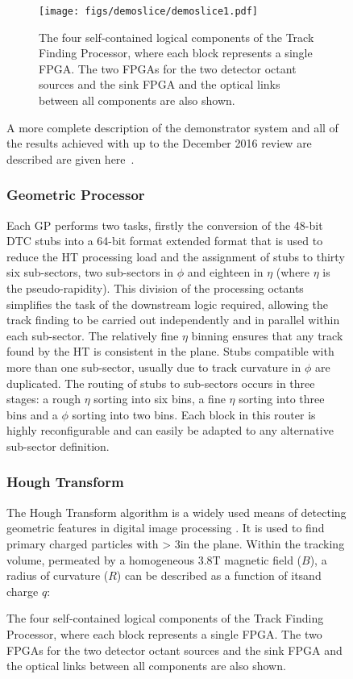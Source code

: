 \begin{figure}[tb]
\begin{figure}[!h]
\centering
\texttt{[image: figs/demoslice/demoslice1.pdf]}
\caption{The four self-contained logical components of the Track Finding Processor, where each block represents a single FPGA. The two FPGAs for the two detector octant sources and the sink FPGA and the optical links between all components are also shown.}
\label{fig:TFP}
\end{figure}

A more complete description of the demonstrator system and all of the results achieved with up to the December 2016 review are described are given here~\cite{TMTT_JINST}.

\subsubsection{Geometric Processor}
Each GP performs two tasks, firstly the conversion of the 48-bit DTC stubs into a 64-bit format extended format that is used to reduce the HT processing load and the assignment of stubs to thirty six sub-sectors, two sub-sectors in $\phi$ and eighteen in $\eta$ (where $\eta$ is the pseudo-rapidity). 
This division of the processing octants simplifies the task of the downstream logic required, allowing the track finding to be carried out independently and in parallel within each sub-sector. 
The relatively fine $\eta$ binning ensures that any track found by the \rphi HT is consistent in the \rz plane. Stubs compatible with more than one sub-sector, usually due to track curvature in $\phi$ are duplicated. 
The routing of stubs to sub-sectors occurs in three stages: a rough $\eta$ sorting into six bins, a fine $\eta$ sorting into three bins and a $\phi$ sorting into two bins. 
Each block in this router is highly reconfigurable and can easily be adapted to any alternative sub-sector definition.

\subsubsection{Hough Transform}
The Hough Transform algorithm is a widely used means of detecting geometric features in digital image processing \cite{HT}. 
It is used to find primary charged particles with \pT > 3\GeV in the \rphi plane. 
Within the tracking volume, permeated by a homogeneous 3.8T magnetic field ($B$), a radius of curvature ($R$) can be described as a function of its\pT and charge $q$:


\end{figure}
